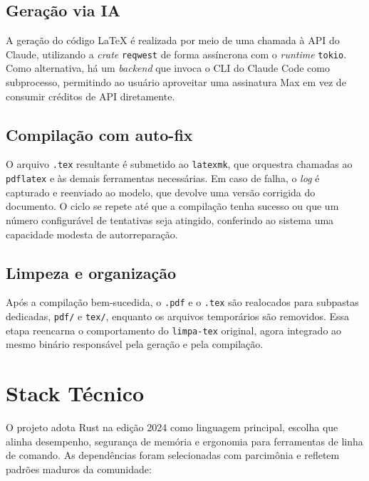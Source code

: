 \documentclass[11pt,a4paper]{article}
\begin{document}
\subsection{Geração via IA}

A geração do código LaTeX é realizada por meio de uma chamada à API do Claude, utilizando a \textit{crate} \texttt{reqwest} de forma assíncrona com o \textit{runtime} \texttt{tokio}. Como alternativa, há um \textit{backend} que invoca o CLI do Claude Code como subprocesso, permitindo ao usuário aproveitar uma assinatura Max em vez de consumir créditos de API diretamente.

\subsection{Compilação com auto-fix}

O arquivo \texttt{.tex} resultante é submetido ao \texttt{latexmk}, que orquestra chamadas ao \texttt{pdflatex} e às demais ferramentas necessárias. Em caso de falha, o \textit{log} é capturado e reenviado ao modelo, que devolve uma versão corrigida do documento. O ciclo se repete até que a compilação tenha sucesso ou que um número configurável de tentativas seja atingido, conferindo ao sistema uma capacidade modesta de autorreparação.

\subsection{Limpeza e organização}

Após a compilação bem-sucedida, o \texttt{.pdf} e o \texttt{.tex} são realocados para subpastas dedicadas, \texttt{pdf/} e \texttt{tex/}, enquanto os arquivos temporários são removidos. Essa etapa reencarna o comportamento do \texttt{limpa-tex} original, agora integrado ao mesmo binário responsável pela geração e pela compilação.

\section{Stack Técnico}

O projeto adota Rust na edição 2024 como linguagem principal, escolha que alinha desempenho, segurança de memória e ergonomia para ferramentas de linha de comando. As dependências foram selecionadas com parcimônia e refletem padrões maduros da comunidade:
\end{document}
